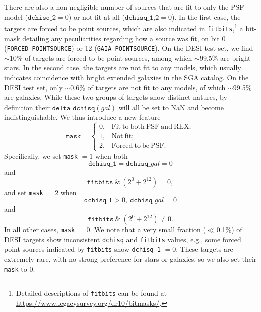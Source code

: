 \documentclass[twocolumn,tighten]{aastex631}
\begin{document}
\begin{CJK*}{UTF8}{gbsn}
There are also a non-negligible number of sources that are fit to only the PSF model ($\texttt{dchisq\_2}=0$) or not fit at all ($\texttt{dchisq\_1,2}=0$). In the first case, the targets are forced to be point sources, which are also indicated in  \texttt{fitbits},\footnote{Detailed descriptions of \texttt{fitbits} can be found at \url{https://www.legacysurvey.org/dr10/bitmasks/}.} a bit-mask detailing any peculiarities regarding how a source was fit, on bit 0 (\texttt{FORCED\_POINTSOURCE}) or 12 (\texttt{GAIA\_POINTSOURCE}). On the DESI test set, we find $\sim$10\% of targets are forced to be point sources, among which $\sim$99.5\% are bright stars. In the second case, the targets are not fit to any models, which usually indicates coincidence with bright extended galaxies in the SGA catalog. On the DESI test set, only $\sim$0.6\% of targets are not fit to any models, of which $\sim$99.5\% are galaxies. While these two groups of targets show distinct natures, by definition their $\texttt{delta\_dchisq}(gal)$ will all be set to NaN and become indistinguishable. We thus introduce a new feature
\begin{equation}\label{eq:feat_mask}
    \texttt{mask} = \left\{
    \begin{array}{cl}
        0, & \mathrm{Fit\ to\ both\ PSF\ and\ REX};\\
        1, & \mathrm{Not\ fit}; \\
        2, & \mathrm{Forced\ to\ be\ PSF}.
    \end{array}
    \right.
\end{equation}
Specifically, we set \texttt{mask} $=1$ when both 
\begin{equation*}
\texttt{dchisq\_1}=\texttt{dchisq\_}\textit{gal}=0
\end{equation*}
and
\begin{equation*}
\texttt{fitbits}\ \&\ (2^0 + 2^{12})=0,
\end{equation*}
and set \texttt{mask} $=2$ when
\begin{equation*}
\texttt{dchisq\_1}>0,\ \texttt{dchisq\_}\textit{gal}=0
\end{equation*}
and
\begin{equation*}
\texttt{fitbits}\ \&\ (2^0 + 2^{12})\neq 0.
\end{equation*}
In all other cases, \texttt{mask} $=0$. We note that a very small fraction ($\ll$0.1\%) of DESI targets show inconsistent \texttt{dchisq} and \texttt{fitbits} values, e.g., some forced point sources indicated by \texttt{fitbits} show \texttt{dchisq\_1} $=0$. These targets are extremely rare, with no strong preference for stars or galaxies, so we also set their \texttt{mask} to 0.


\end{CJK*}
\end{document}
